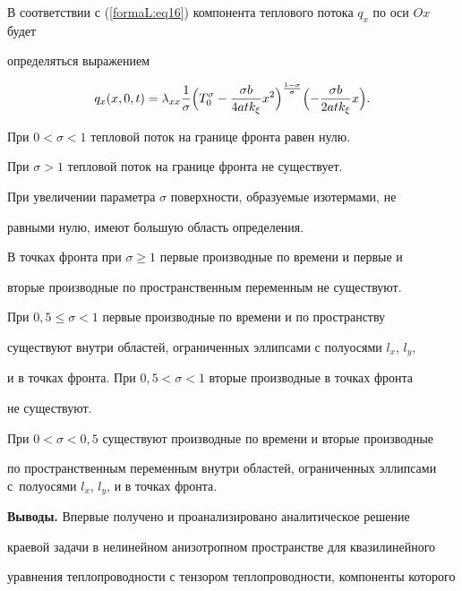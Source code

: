 В соответствии с (\ref{formaL:eq16}) компонента теплового потока $q_x $ по оси $Ox$ будет 

определяться выражением

\[

q_x (x, 0, t)=\lambda _{xx} \frac{1}{\sigma }

\Bigl(T_0^\sigma -\frac{\sigma b}{4atk_\xi}x^2\Bigr)^{\frac{1-\sigma }{\sigma }}

\Bigl( -\frac{\sigma b }{2atk_\xi }x\Bigr).

\]



При $0<\sigma <1$ тепловой поток на границе фронта равен нулю.

При $\sigma >1$ тепловой поток на границе фронта не существует. 

При увеличении параметра $\sigma $ поверхности, образуемые изотермами, не 

равными нулю, имеют большую область определения.



В точках фронта при $\sigma \ge  1$ первые производные по времени и первые и 

вторые производные по пространственным переменным не существуют.



При $0,5\le \sigma <1$ первые производные по времени и по пространству 

существуют внутри областей, ограниченных эллипсами с полуосями $l_x$, $l_y $,

и в точках фронта. При $0,5<\sigma <1$ вторые производные в точках фронта 

не существуют.



При $0<\sigma <0,5$ существуют производные по времени и вторые производные 

по пространственным переменным внутри областей, ограниченных эллипсами с~полуосями $l_x$, $l_y $, и в точках фронта.



\renewcommand{\baselinestretch}{0.85}



\smallskip

\textbf{Выводы.} Впервые получено и проанализировано аналитическое решение 

краевой задачи в нелинейном анизотропном пространстве для квазилинейного 

уравнения теплопроводности с тензором теплопроводности, компоненты которого 


